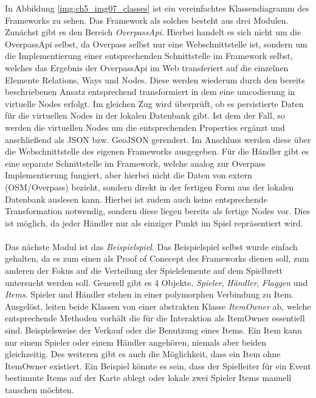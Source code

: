 In Abbildung \ref{img:ch5_img07_classes} ist ein vereinfachtes Klassendiagramm des Frameworks zu sehen. Das Framework als solches besteht aus drei Modulen. Zunächst gibt es den Bereich \textit{OverpassApi}. Hierbei handelt es sich nicht um die OverpassApi selbst, da Overpass selbst nur eine Webschnittstelle ist, sondern um die Implementierung einer entsprechenden Schnittstelle im Framework selbst, welches das Ergebnis der OverpassApi im Web transferiert auf die einzelnen Elemente Relations, Ways und Nodes. Diese werden wiederum durch den bereits beschriebenen Ansatz entsprechend transformiert in dem eine umcodierung in virtuelle Nodes erfolgt. Im gleichen Zug wird überprüft, ob es persistierte Daten für die virtuellen Nodes in der lokalen Datenbank gibt. Ist dem der Fall, so werden die virtuellen Nodes um die entsprechenden Properties ergänzt und anschließend als JSON bzw. GeoJSON gerendert.
Im Anschluss werden diese über die Webschnittstelle des eigenen Frameworks ausgegeben.
Für die Händler gibt es eine separate Schnittstelle im Framework, welche analog zur Overpass Implementierung fungiert, aber hierbei nicht die Daten von extern (OSM/Overpass) bezieht, sondern direkt in der fertigen Form aus der lokalen Datenbank auslesen kann. Hierbei ist zudem auch keine entsprechende Transformation notwendig, sondern diese liegen bereits als fertige Nodes vor. Dies ist möglich, da jeder Händler nur als einziger Punkt im Spiel repräsentiert wird.
\\\\
Das nächste Modul ist das \textit{Beispielspiel}. Das Beispielspiel selbst wurde einfach gehalten, da es zum einen als Proof of Conecept des Frameworks dienen soll, zum anderen der Fokus auf die Verteilung der Spielelemente auf dem Spielbrett untersucht werden soll.
Generell gibt es 4 Objekte. \textit{Spieler}, \textit{Händler}, \textit{Flaggen} und \textit{Items}.
Spieler und Händler stehen in einer polymorphen Verbindung zu Item. Ausgelöst, leiten beide Klassen von einer abstrakten Klasse \textit{ItemOwner} ab, welche entsprechende Methoden vorhält die für die Interaktion als ItemOwner essentiell sind. Beispielsweise der Verkauf oder die Benutzung eines Items. Ein Item kann nur einem Spieler oder einem Händler angehören, niemals aber beiden gleichzeitig. Des weiteren gibt es auch die Möglichkeit, dass ein Item ohne ItemOwner existiert. Ein Beispiel könnte es sein, dass der Spielleiter für ein Event bestimmte Items auf der Karte ablegt oder lokale zwei Spieler Items manuell tauschen möchten.
\\\\
